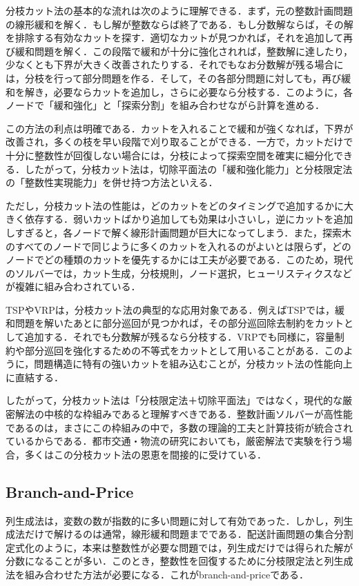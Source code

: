 分枝カット法の基本的な流れは次のように理解できる．まず，元の整数計画問題の線形緩和を解く．もし解が整数ならば終了である．もし分数解ならば，その解を排除する有効なカットを探す．適切なカットが見つかれば，それを追加して再び緩和問題を解く．この段階で緩和が十分に強化されれば，整数解に達したり，少なくとも下界が大きく改善されたりする．それでもなお分数解が残る場合には，分枝を行って部分問題を作る．そして，その各部分問題に対しても，再び緩和を解き，必要ならカットを追加し，さらに必要なら分枝する．このように，各ノードで「緩和強化」と「探索分割」を組み合わせながら計算を進める．

この方法の利点は明確である．カットを入れることで緩和が強くなれば，下界が改善され，多くの枝を早い段階で刈り取ることができる．一方で，カットだけで十分に整数性が回復しない場合には，分枝によって探索空間を確実に細分化できる．したがって，分枝カット法は，切除平面法の「緩和強化能力」と分枝限定法の「整数性実現能力」を併せ持つ方法といえる．

ただし，分枝カット法の性能は，どのカットをどのタイミングで追加するかに大きく依存する．弱いカットばかり追加しても効果は小さいし，逆にカットを追加しすぎると，各ノードで解く線形計画問題が巨大になってしまう．また，探索木のすべてのノードで同じように多くのカットを入れるのがよいとは限らず，どのノードでどの種類のカットを優先するかには工夫が必要である．このため，現代のソルバーでは，カット生成，分枝規則，ノード選択，ヒューリスティクスなどが複雑に組み合わされている．

TSPやVRPは，分枝カット法の典型的な応用対象である．例えばTSPでは，緩和問題を解いたあとに部分巡回が見つかれば，その部分巡回除去制約をカットとして追加する．それでも分数解が残るなら分枝する．VRPでも同様に，容量制約や部分巡回を強化するための不等式をカットとして用いることがある．このように，問題構造に特有の強いカットを組み込むことが，分枝カット法の性能向上に直結する．

したがって，分枝カット法は「分枝限定法＋切除平面法」ではなく，現代的な厳密解法の中核的な枠組みであると理解すべきである．整数計画ソルバーが高性能であるのは，まさにこの枠組みの中で，多数の理論的工夫と計算技術が統合されているからである．都市交通・物流の研究においても，厳密解法で実験を行う場合，多くはこの分枝カット法の恩恵を間接的に受けている．

\subsection{Branch-and-Price}

列生成法は，変数の数が指数的に多い問題に対して有効であった．しかし，列生成法だけで解けるのは通常，線形緩和問題までである．配送計画問題の集合分割定式化のように，本来は整数性が必要な問題では，列生成だけでは得られた解が分数になることが多い．このとき，整数性を回復するために分枝限定法と列生成法を組み合わせた方法が必要になる．これがbranch-and-priceである\cite{Barnhart1998}．

